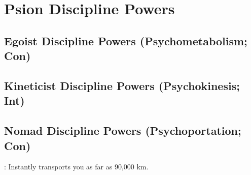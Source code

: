 \section{Psion Discipline Powers}



\subsection{Egoist Discipline Powers {\normalsize(Psychometabolism; Con)}}
\begin{enumerate*}
\item
\item
\item
\item
\item
\item
\item
\item
\item
\end{enumerate*}



\subsection{Kineticist Discipline Powers {\normalsize(Psychokinesis; Int)}}
\begin{enumerate*}
\item
\item
\item
\item
\item
\item
\item
\item
\item
\end{enumerate*}



\subsection{Nomad Discipline Powers {\normalsize(Psychoportation; Con)}}
\begin{enumerate*}
\item
\item
\item
\item
\item {}: Instantly transports you as far as 90,000 km.
\item
\item
\item
\item
\end{enumerate*}



